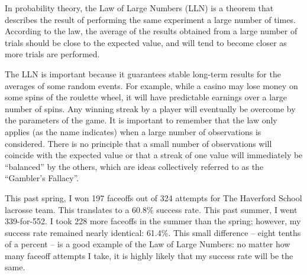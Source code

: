 
In probability theory, the Law of Large Numbers (LLN) is a theorem that describes the result of performing the same experiment a large number of times. According to the law, the average of the results obtained from a large number of trials should be close to the expected value, and will tend to become closer as more trials are performed.

The LLN is important because it guarantees stable long-term results for the averages of some random events. For example, while a casino may lose money on some spins of the roulette wheel, it will have predictable earnings over a large number of spins. Any winning streak by a player will eventually be overcome by the parameters of the game. It is important to remember that the law only applies (as the name indicates) when a large number of observations is considered. There is no principle that a small number of observations will coincide with the expected value or that a streak of one value will immediately be ``balanced'' by the others, which are ideas collectively referred to as the ``Gambler’s Fallacy''.

This past spring, I won 197 faceoffs out of 324 attempts for The Haverford School lacrosse team. This translates to a 60.8\% success rate. This past summer, I went 339-for-552. I took 228 more faceoffs in the summer than the spring; however, my success rate remained nearly identical: 61.4\%. This small difference – eight tenths of a percent – is a good example of the Law of Large Numbers: no matter how many faceoff attempts I take, it is highly likely that my success rate will be the same. 
